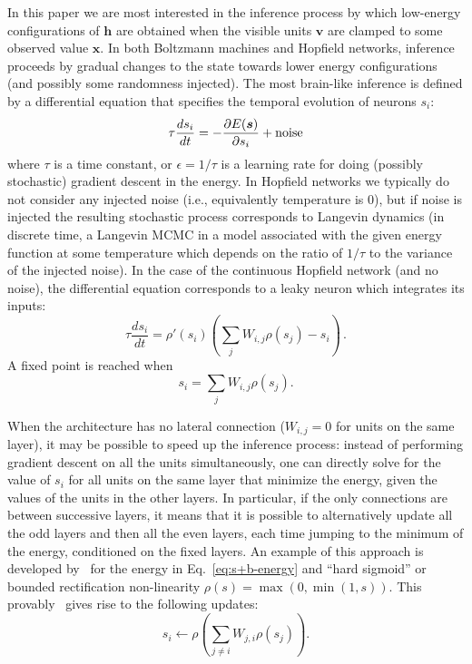 \documentclass{article}
\newcommand   \vv{{\bm v}}
\newcommand   \vx{{\bm x}}
\newcommand   \vh{{\bm h}}
\newcommand   \vs{{\bm s}}
\begin{document}
In this paper we are most interested in the inference process by which low-energy
configurations of $\vh$ are obtained when the visible units $\vv$ are clamped
to some observed value $\vx$. In both Boltzmann machines and Hopfield networks,
inference proceeds by gradual changes to the state towards lower energy
configurations (and possibly some randomness injected). The most brain-like
inference is defined by a differential equation that specifies the temporal
evolution of neurons $s_i$:
\begin{equation}
  \label{eq:dsdt}
  \tau \frac{ds_i}{dt} = - \frac{\partial E(\vs)}{\partial s_i} + {\rm noise}
\end{equation}
where $\tau$ is a time constant, or $\epsilon=1/\tau$ is a learning rate for doing
(possibly stochastic) gradient descent in the energy. In Hopfield networks we
typically do not consider any injected noise (i.e., equivalently temperature is 0), but if noise is injected the resulting
stochastic process corresponds to Langevin dynamics (in discrete time, a Langevin
MCMC in a model associated with the given energy function at some temperature which
depends on the ratio of $1/\tau$ to the variance of the injected noise).
In the case of the continuous Hopfield network (and no noise), the differential equation corresponds
to a leaky neuron which integrates its inputs:
\begin{equation}
  \tau \frac{ds_i}{dt} = \rho'(s_i) \left( \sum_j W_{i,j} \rho(s_j) - s_i \right)\,.
\end{equation}
A fixed point is reached when
\begin{equation}
   s_i = \sum_j W_{i,j} \rho(s_j).
\end{equation}

When the architecture has no lateral connection ($W_{i,j}=0$ for units on the same layer),
it may be possible to speed up the inference process: instead of performing
gradient descent on all the units simultaneously, one can directly solve
for the value of $s_i$ for all units on the same layer that minimize the
energy, given the values of the units in the other layers. In particular,
if the only connections are between successive layers, it means that it is
possible to alternatively update all the odd layers and then all the even
layers, each time jumping to the minimum of the energy, conditioned on
the fixed layers. An example of this approach is developed by~\citet{Scellier+Bengio-arxiv2016}
for the energy in Eq.~\ref{eq:s+b-energy} and ``hard sigmoid''
or bounded rectification non-linearity $\rho(s)=\max(0,\min(1,s))$.
This provably~\citep{Scellier+Bengio-arxiv2016} gives rise to the following updates:
\begin{equation}
  \label{eq:direct}
   s_i \leftarrow \rho(\sum_{j\neq i} W_{j,i} \rho(s_j)). %
\end{equation}
\end{document}
